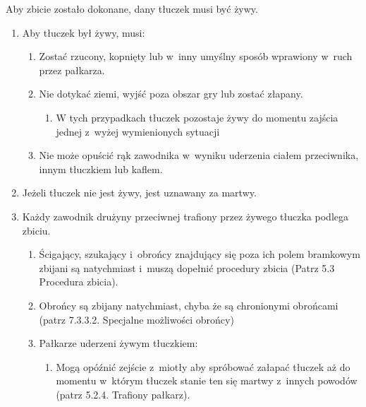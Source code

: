 \documentclass[12pt,a4paper]{article}
\begin{document}
Aby zbicie zostało dokonane, dany tłuczek musi być żywy.

\begin{enumerate}
	\item
	      Aby tłuczek był żywy, musi:

	      \begin{enumerate}
		      \item
		            Zostać rzucony, kopnięty lub w~inny umyślny sposób wprawiony w~ruch przez pałkarza.
		      \item
		            Nie dotykać ziemi, wyjść poza obszar gry lub zostać złapany.

		            \begin{enumerate}
			            \item
			                  W tych przypadkach tłuczek pozostaje żywy do momentu zajścia jednej z~wyżej
			                  wymienionych sytuacji
		            \end{enumerate}
		      \item
		            Nie może opuścić rąk zawodnika w~wyniku uderzenia ciałem
		            przeciwnika, innym tłuczkiem lub kaflem.
	      \end{enumerate}
	\item
	      Jeżeli tłuczek nie jest żywy, jest uznawany za martwy.
	\item
	      Każdy zawodnik drużyny przeciwnej trafiony przez żywego tłuczka
	      podlega zbiciu.

	      \begin{enumerate}
		      \item
		            Ścigający, szukający i~obrońcy znajdujący się poza ich polem
		            bramkowym zbijani są natychmiast i~muszą dopełnić procedury zbicia
		            (Patrz 5.3 Procedura zbicia).
		      \item
		            Obrońcy są zbijany natychmiast, chyba że są chronionymi obrońcami
		            (patrz 7.3.3.2. Specjalne możliwości obrońcy)
		      \item
		            Pałkarze uderzeni żywym tłuczkiem:

		            \begin{enumerate}
			            \item
			                  Mogą opóźnić zejście z~miotły aby spróbować załapać tłuczek aż do
			                  momentu w~którym tłuczek stanie ten się martwy z~innych powodów
			                  (patrz 5.2.4. Trafiony pałkarz).


\end{enumerate}
\end{enumerate}
\end{enumerate}
\end{document}
